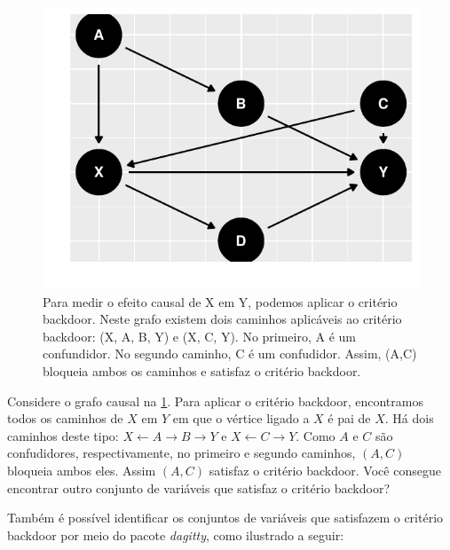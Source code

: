 \begin{example}
\begin{knitrout}
\color{fgcolor}\begin{figure}[t]

{\centering \includegraphics[width=\maxwidth]{figure/backdoor_ex_2-1} 

}

\caption[Para medir o efeito causal de X em Y, podemos aplicar o critério backdoor]{Para medir o efeito causal de X em Y, podemos aplicar o critério backdoor. Neste grafo existem dois caminhos aplicáveis ao critério backdoor: (X, A, B, Y) e (X, C, Y). No primeiro, A é um confundidor. No segundo caminho, C é um confudidor. Assim, (A,C) bloqueia ambos os caminhos e satisfaz o critério backdoor.}\label{fig:backdoor_ex_2}
\end{figure}

\end{knitrout}

 Considere o grafo causal na \cref{fig:backdoor_ex_2}.
 Para aplicar o critério backdoor,
 encontramos todos os caminhos de $X$ em $Y$ em que
 o vértice ligado a $X$ é pai de $X$. 
 Há dois caminhos deste tipo:
 $X \leftarrow A \rightarrow B \rightarrow Y$ e
 $X \leftarrow C \rightarrow Y$.
 Como $A$ e $C$ são confudidores, respectivamente,
 no primeiro e segundo caminhos, 
 $(A,C)$ bloqueia ambos eles.
 Assim $(A,C)$ satisfaz o critério backdoor.
 Você consegue encontrar outro conjunto de variáveis que
 satisfaz o critério backdoor?
 
 Também é possível identificar 
 os conjuntos de variáveis que satisfazem
 o critério backdoor por meio
 do pacote \textit{dagitty},
 como ilustrado a seguir:
 

\end{example}
